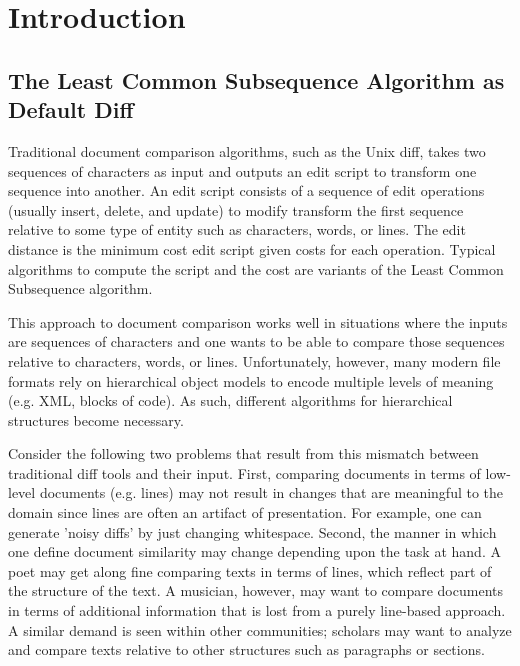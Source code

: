\documentclass{article}
\title{\papertitle}
\begin{document}
%
\capstartfalse
\maketitle
\capstarttrue
%
\begin{abstract}
We describe an initial approach to hierarchic diff for collaborative music document editing of tree-based music representations, using Zhang and Shasha's tree edit distance
algorithm as implemented within the XUDiff tool.  The edit distance
between two trees is the minimum number of edit operations necessary
to transform one tree into another.  We consider common operations on the score tree -- deleting, changing, and appending tree nodes -- to derive a minimal edit sequence, known as an edit script.
\end{abstract}
%

\section{Introduction}\label{sec:introduction}
\subsection{The Least Common Subsequence Algorithm as Default Diff}
Traditional document comparison algorithms, such as the Unix diff,
takes two sequences of characters as input and outputs an edit script
to transform one sequence into another.  An edit script consists of a
sequence of edit operations (usually insert, delete, and update) to
modify transform the first sequence relative to some type of entity
such as characters, words, or lines.  The edit distance is the minimum
cost edit script given costs for each operation.  Typical algorithms
to compute the script and the cost are variants of the Least Common
Subsequence algorithm.  


This approach to document comparison works well in situations where
the inputs are sequences of characters and one wants to be
able to compare those sequences relative to characters, words, or
lines.  Unfortunately, however, many modern file formats rely on
hierarchical object models to encode multiple levels of meaning
(e.g. XML, blocks of code).  As such, different algorithms for
hierarchical structures become necessary.  

Consider the following two
problems that result from this mismatch between traditional diff tools
and their input.  First, comparing documents in terms of low-level
documents (e.g. lines) may not result in changes that are meaningful
to the domain since lines are often an artifact of presentation.  For
example, one can generate 'noisy diffs' by just changing whitespace.
Second, the manner in which one define document similarity may change
depending upon the task at hand.  A poet may get along fine comparing
texts in terms of lines, which reflect part of the structure of the
text.  A musician, however, may want to compare documents in terms of
additional information that is lost from a purely line-based
approach.  A similar demand is seen within other communities; scholars
may want to analyze and compare texts relative to other structures
such as paragraphs or sections.
\end{document}
